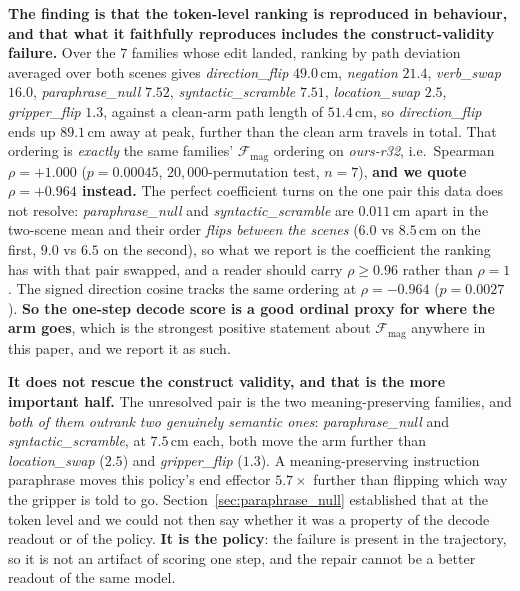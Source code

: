 \documentclass{article}
\begin{document}
\textbf{The finding is that the token-level ranking is reproduced in behaviour, and that what it faithfully reproduces includes the construct-validity failure.} Over the $7$ families whose edit landed, ranking by path deviation averaged over both scenes gives \emph{direction\_flip} $49.0$\,cm, \emph{negation} $21.4$, \emph{verb\_swap} $16.0$, \emph{paraphrase\_null} $7.52$, \emph{syntactic\_scramble} $7.51$, \emph{location\_swap} $2.5$, \emph{gripper\_flip} $1.3$, against a clean-arm path length of $51.4$\,cm, so \emph{direction\_flip} ends up $89.1$\,cm away at peak, further than the clean arm travels in total. That ordering is \emph{exactly} the same families' $\mathcal{F}_{\text{mag}}$ ordering on \emph{ours-r32}, i.e.\ Spearman $\rho = +1.000$ ($p = 0.00045$, $20{,}000$-permutation test, $n=7$), \textbf{and we quote $\rho = +0.964$ instead.} The perfect coefficient turns on the one pair this data does not resolve: \emph{paraphrase\_null} and \emph{syntactic\_scramble} are $0.011$\,cm apart in the two-scene mean and their order \emph{flips between the scenes} ($6.0$ vs $8.5$\,cm on the first, $9.0$ vs $6.5$ on the second), so what we report is the coefficient the ranking has with that pair swapped, and a reader should carry $\rho \geq 0.96$ rather than $\rho = 1$. The signed direction cosine tracks the same ordering at $\rho = -0.964$ ($p = 0.0027$). \textbf{So the one-step decode score is a good ordinal proxy for where the arm goes}, which is the strongest positive statement about $\mathcal{F}_{\text{mag}}$ anywhere in this paper, and we report it as such.

\textbf{It does not rescue the construct validity, and that is the more important half.} The unresolved pair is the two meaning-preserving families, and \emph{both of them outrank two genuinely semantic ones}: \emph{paraphrase\_null} and \emph{syntactic\_scramble}, at $7.5$\,cm each, both move the arm further than \emph{location\_swap} ($2.5$) and \emph{gripper\_flip} ($1.3$). A meaning-preserving instruction paraphrase moves this policy's end effector $5.7\times$ further than flipping which way the gripper is told to go. Section~\ref{sec:paraphrase_null} established that at the token level and we could not then say whether it was a property of the decode readout or of the policy. \textbf{It is the policy}: the failure is present in the trajectory, so it is not an artifact of scoring one step, and the repair cannot be a better readout of the same model.
\end{document}
